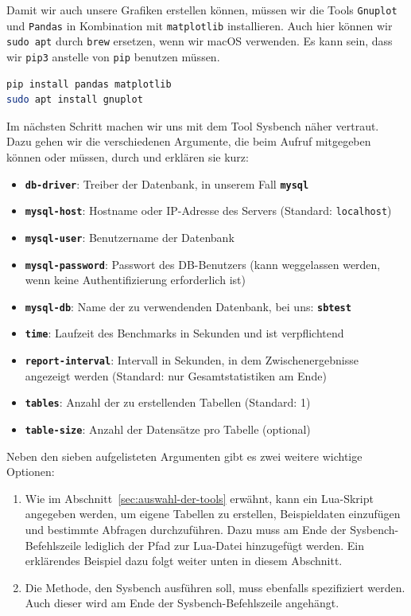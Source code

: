 Damit wir auch unsere Grafiken erstellen können, müssen wir die Tools \texttt{Gnuplot} und \texttt{Pandas} in Kombination mit \texttt{matplotlib} installieren.
Auch hier können wir \texttt{sudo apt} durch \texttt{brew} ersetzen, wenn wir macOS verwenden.
Es kann sein, dass wir \texttt{pip3} anstelle von \texttt{pip} benutzen müssen.

\vspace{-5pt}
\begin{lstlisting}[language=bash]
pip install pandas matplotlib
sudo apt install gnuplot
\end{lstlisting}
\vspace{-9pt}

Im nächsten Schritt machen wir uns mit dem Tool Sysbench näher vertraut.
Dazu gehen wir die verschiedenen Argumente, die beim Aufruf mitgegeben können oder müssen, durch und erklären sie kurz:

\vspace{-5pt}
\begin{itemize}
    \setlength{\itemsep}{-7pt}
    \item \textbf{\texttt{db-driver}}: Treiber der Datenbank, in unserem Fall \textbf{\texttt{mysql}}
    \item \textbf{\texttt{mysql-host}}: Hostname oder IP-Adresse des Servers (Standard: \texttt{localhost})
    \item \textbf{\texttt{mysql-user}}: Benutzername der Datenbank
    \item \textbf{\texttt{mysql-password}}: Passwort des DB-Benutzers (kann weggelassen werden, wenn keine Authentifizierung erforderlich ist)
    \item \textbf{\texttt{mysql-db}}: Name der zu verwendenden Datenbank, bei uns: \textbf{\texttt{sbtest}}
    \item \textbf{\texttt{time}}: Laufzeit des Benchmarks in Sekunden und ist verpflichtend
    \item \textbf{\texttt{report-interval}}: Intervall in Sekunden, in dem Zwischenergebnisse angezeigt werden (Standard: nur Gesamtstatistiken am Ende)
    \item \textbf{\texttt{tables}}: Anzahl der zu erstellenden Tabellen (Standard: 1)
    \item \textbf{\texttt{table-size}}: Anzahl der Datensätze pro Tabelle (optional)
\end{itemize}

Neben den sieben aufgelisteten Argumenten gibt es zwei weitere wichtige Optionen:
\begin{enumerate}
    \item Wie im Abschnitt~\ref{sec:auswahl-der-tools} erwähnt, kann ein Lua-Skript angegeben werden, um eigene Tabellen zu erstellen, Beispieldaten einzufügen und bestimmte Abfragen durchzuführen.
    Dazu muss am Ende der Sysbench-Befehlszeile lediglich der Pfad zur Lua-Datei hinzugefügt werden.
    Ein erklärendes Beispiel dazu folgt weiter unten in diesem Abschnitt.
    \item Die Methode, den Sysbench ausführen soll, muss ebenfalls spezifiziert werden.
    Auch dieser wird am Ende der Sysbench-Befehlszeile angehängt.
\end{enumerate}

